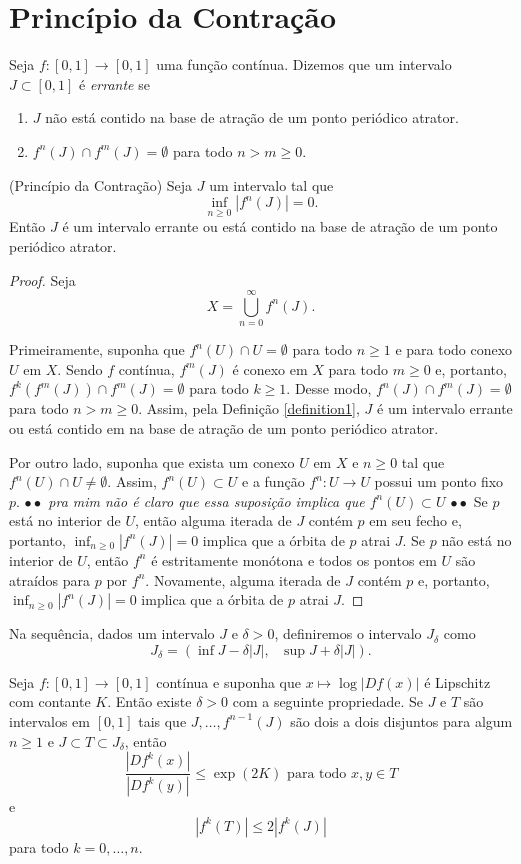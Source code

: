 \section{Princípio da Contração}

\begin{definition}
\label{definition1}
Seja $f: [0,1] \to [0,1]$ uma função contínua. Dizemos que um intervalo $J \subset [0,1]$ é \textit{errante} se
\begin{enumerate}
\item $J$ não está contido na base de atração de um ponto periódico atrator.
\item $f^n(J) \cap f^m(J) = \emptyset$ para todo $n > m \geq 0$.
\end{enumerate}


\begin{lemma}(Princípio da Contração)
Seja $J$ um intervalo tal que
$$\inf_{n \geq 0} |f^n(J)| = 0.$$
Então $J$ é um intervalo errante ou está contido na base de atração de um ponto periódico atrator.
\end{lemma}

\begin{proof}
Seja $$X = \bigcup_{n = 0}^\infty f^n(J).$$

Primeiramente, suponha que $f^n(U) \cap U = \emptyset$ para todo $n \geq 1$ e para todo conexo $U$ em $X$. Sendo $f$ contínua, $f^m(J)$ é conexo em $X$ para todo $m \geq 0$ e, portanto, $f^k(f^m(J)) \cap f^m(J) = \emptyset$ para todo $k \geq 1$. Desse modo, $f^n(J) \cap f^m(J) = \emptyset$ para todo $n > m \geq 0$. Assim, pela Definição \ref{definition1}, $J$ é um intervalo errante ou está contido em na base de atração de um ponto periódico atrator.

Por outro lado, suponha que exista um conexo $U$ em $X$ e $n \geq 0$ tal que $f^n(U) \cap U \neq \emptyset$. Assim, $f^n(U) \subset U$ e a função $f^n: U \to U$ possui um ponto fixo $p$. \textit{$\bullet \bullet$ pra mim não é claro que essa suposição implica que $f^n(U) \subset U$ $\bullet \bullet$}
Se $p$ está no interior de $U$, então alguma iterada de $J$ contém $p$ em seu fecho e, portanto, $\inf_{n \geq 0} |f^n(J)| = 0$ implica que a órbita de $p$ atrai $J$. Se $p$ não está no interior de $U$, então $f^n$ é estritamente monótona e todos os pontos em $U$ são atraídos para $p$ por $f^n$. Novamente, alguma iterada de $J$ contém $p$ e, portanto, $\inf_{n \geq 0} |f^n(J)| = 0$ implica que a órbita de $p$ atrai $J$.
\end{proof}
Na sequência, dados um intervalo $J$ e $\delta > 0$, definiremos o intervalo $J_\delta$ como
$$J_\delta = (\inf J - \delta |J| , \textrm{ } \sup J + \delta |J|).$$
\begin{lemma}
Seja $f: [0,1] \to [0,1]$ contínua e suponha que $x \mapsto \log |Df(x)|$ é Lipschitz com contante $K$. Então existe $\delta > 0$ com a seguinte propriedade. Se $J$ e $T$ são intervalos em $[0,1]$ tais que $J, \dots, f^{n-1}(J)$ são dois a dois disjuntos para algum $n \geq 1$ e $J \subset T \subset J_\delta$, então
$$\frac{|Df^k(x)|}{|Df^k(y)|} \leq \exp(2K) \textrm{ para todo } x, y \in T$$
e
$$|f^k(T)| \leq 2 |f^k(J)|$$
para todo $k = 0, \dots, n$.
\end{lemma}


\end{definition}
